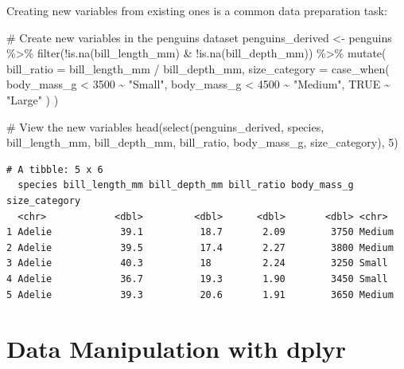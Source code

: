 \documentclass[
  letterpaper,
]{book}
\newenvironment{Shaded}{\begin{snugshade}}{\end{snugshade}}
\newcommand{\AttributeTok}[1]{\textcolor[rgb]{0.40,0.45,0.13}{#1}}
\newcommand{\CommentTok}[1]{\textcolor[rgb]{0.37,0.37,0.37}{#1}}
\newcommand{\ConstantTok}[1]{\textcolor[rgb]{0.56,0.35,0.01}{#1}}
\newcommand{\DecValTok}[1]{\textcolor[rgb]{0.68,0.00,0.00}{#1}}
\newcommand{\FunctionTok}[1]{\textcolor[rgb]{0.28,0.35,0.67}{#1}}
\newcommand{\NormalTok}[1]{\textcolor[rgb]{0.00,0.23,0.31}{#1}}
\newcommand{\OtherTok}[1]{\textcolor[rgb]{0.00,0.23,0.31}{#1}}
\newcommand{\SpecialCharTok}[1]{\textcolor[rgb]{0.37,0.37,0.37}{#1}}
\newcommand{\StringTok}[1]{\textcolor[rgb]{0.13,0.47,0.30}{#1}}
\begin{document}
Creating new variables from existing ones is a common data preparation
task:

\begin{Shaded}
\begin{Highlighting}[]
\CommentTok{\# Create new variables in the penguins dataset}
\NormalTok{penguins\_derived }\OtherTok{\textless{}{-}}\NormalTok{ penguins }\SpecialCharTok{\%\textgreater{}\%}
  \FunctionTok{filter}\NormalTok{(}\SpecialCharTok{!}\FunctionTok{is.na}\NormalTok{(bill\_length\_mm) }\SpecialCharTok{\&} \SpecialCharTok{!}\FunctionTok{is.na}\NormalTok{(bill\_depth\_mm)) }\SpecialCharTok{\%\textgreater{}\%}
  \FunctionTok{mutate}\NormalTok{(}
    \AttributeTok{bill\_ratio =}\NormalTok{ bill\_length\_mm }\SpecialCharTok{/}\NormalTok{ bill\_depth\_mm,}
    \AttributeTok{size\_category =} \FunctionTok{case\_when}\NormalTok{(}
\NormalTok{      body\_mass\_g }\SpecialCharTok{\textless{}} \DecValTok{3500} \SpecialCharTok{\textasciitilde{}} \StringTok{"Small"}\NormalTok{,}
\NormalTok{      body\_mass\_g }\SpecialCharTok{\textless{}} \DecValTok{4500} \SpecialCharTok{\textasciitilde{}} \StringTok{"Medium"}\NormalTok{,}
      \ConstantTok{TRUE} \SpecialCharTok{\textasciitilde{}} \StringTok{"Large"}
\NormalTok{    )}
\NormalTok{  )}

\CommentTok{\# View the new variables}
\FunctionTok{head}\NormalTok{(}\FunctionTok{select}\NormalTok{(penguins\_derived, species, bill\_length\_mm, bill\_depth\_mm, }
\NormalTok{             bill\_ratio, body\_mass\_g, size\_category), }\DecValTok{5}\NormalTok{)}
\end{Highlighting}
\end{Shaded}

\begin{verbatim}
# A tibble: 5 x 6
  species bill_length_mm bill_depth_mm bill_ratio body_mass_g size_category
  <chr>            <dbl>         <dbl>      <dbl>       <dbl> <chr>        
1 Adelie            39.1          18.7       2.09        3750 Medium       
2 Adelie            39.5          17.4       2.27        3800 Medium       
3 Adelie            40.3          18         2.24        3250 Small        
4 Adelie            36.7          19.3       1.90        3450 Small        
5 Adelie            39.3          20.6       1.91        3650 Medium       
\end{verbatim}

\section{Data Manipulation with
dplyr}\label{data-manipulation-with-dplyr}
\end{document}
